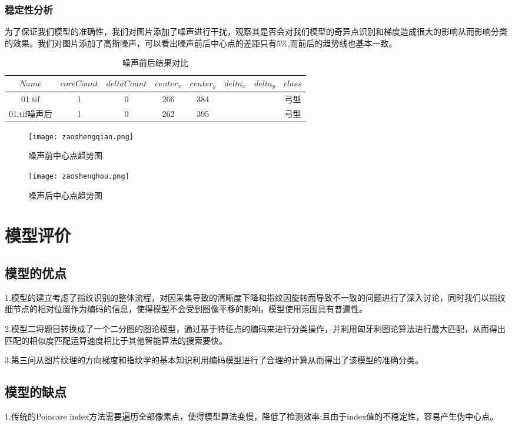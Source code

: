 \documentclass[withoutpreface,bwprint]{cumcmthesis} %
\begin{document}
\subsubsection{稳定性分析}
为了保证我们模型的准确性，我们对图片添加了噪声进行干扰，观察其是否会对我们模型的奇异点识别和梯度造成很大的影响从而影响分类的效果。我们对图片添加了高斯噪声，可以看出噪声前后中心点的差距只有$5\%$,而前后的趋势线也基本一致。
\begin{table}[!htbp]
	\caption{噪声前后结果对比} \centering
	\begin{tabular}{cccccccc}
		\toprule[1.5pt]
		$Name$ & $coreCount$ & $deltaCount$ & $center_x$ & $center_y$ & $delta_x$ & $delta_y$ &  $class$\\
		\midrule[1pt]
		
		01.tif&	1&	0&	    266&	    384&	  &   	&	弓型\\
		01.tif噪声后&	1&	0&	    262&	    395&	  &   	&	弓型\\
		\bottomrule[1.5pt]
	\end{tabular}
\end{table}
\begin{figure}[!h]
	\centering
	\texttt{[image: zaoshengqian.png]}
	\caption{噪声前中心点趋势图}
\end{figure}
\begin{figure}[!h]
	\centering
	\texttt{[image: zaoshenghou.png]}
	\caption{噪声后中心点趋势图}
\end{figure}
\section{模型评价}
\subsection{模型的优点}
1.模型的建立考虑了指纹识别的整体流程，对因采集导致的清晰度下降和指纹因旋转而导致不一致的问题进行了深入讨论，同时我们以指纹细节点的相对位置作为编码的信息，使得模型不会受到图像平移的影响，模型使用范围具有普遍性。

2.模型二将题目转换成了一个二分图的图论模型，通过基于特征点的编码来进行分类操作，并利用匈牙利图论算法进行最大匹配，从而得出匹配的相似度匹配运算速度相比于其他智能算法的搜索要快。

3.第三问从图片纹理的方向梯度和指纹学的基本知识利用编码模型进行了合理的计算从而得出了该模型的准确分类。


\subsection{模型的缺点}
1.传统的Poincare index方法需要遍历全部像素点，使得模型算法变慢，降低了检测效率;且由于index值的不稳定性，容易产生伪中心点。
\end{document}
